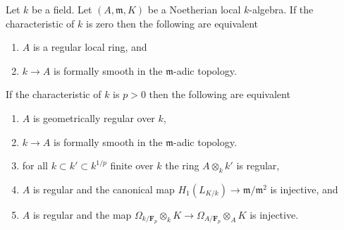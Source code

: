 \begin{theorem}
\label{theorem-regular-fs}
Let $k$ be a field. Let $(A, \mathfrak m, K)$ be a Noetherian local
$k$-algebra. If the characteristic of $k$ is zero then the following
are equivalent
\begin{enumerate}
\item $A$ is a regular local ring, and
\item $k \to A$ is formally smooth in the $\mathfrak m$-adic topology.
\end{enumerate}
If the characteristic of $k$ is $p > 0$ then the following are equivalent
\begin{enumerate}
\item $A$ is geometrically regular over $k$,
\item $k \to A$ is formally smooth in the $\mathfrak m$-adic topology.
\item for all $k \subset k' \subset k^{1/p}$
finite over $k$ the ring $A \otimes_k k'$ is regular,
\item $A$ is regular and the canonical map
$H_1(L_{K/k}) \to \mathfrak m/\mathfrak m^2$ is injective, and
\item $A$ is regular and the map
$\Omega_{k/\mathbf{F}_p} \otimes_k K \to \Omega_{A/\mathbf{F}_p} \otimes_A K$
is injective.
\end{enumerate}
\end{theorem}

